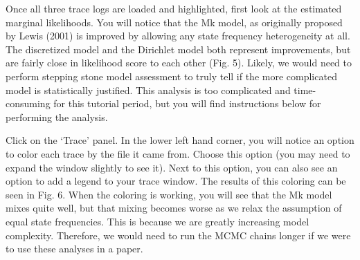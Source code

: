 Once all three trace logs are loaded and highlighted, first look at the estimated marginal likelihoods.
You will notice that the Mk model, as originally proposed by Lewis (2001) is improved by allowing any state frequency heterogeneity at all. 
The discretized model and the Dirichlet model both represent improvements, but are fairly close in likelihood score to each other (Fig. 5).
Likely, we would need to perform stepping stone model assessment to truly tell if the more complicated model is statistically justified.
This analysis is too complicated and time-consuming for this tutorial period, but you will find instructions below for performing the analysis. \par
\begin{figure}[h!]
\label{fig:module-gm}
\end{figure}

Click on the `Trace' panel.
In the lower left hand corner, you will notice an option to color each trace by the file it came from.
Choose this option (you may need to expand the window slightly to see it).
Next to this option, you can also see an option to add a legend to your trace window.
The results of this coloring can be seen in Fig. 6.
When the coloring is working, you will see that the Mk model mixes quite well, but that mixing becomes worse as we relax the assumption of equal state frequencies.
This is because we are greatly increasing model complexity.
Therefore, we would need to run the MCMC chains longer if we were to use these analyses in a paper. \par

\begin{figure}[h!]
\label{fig:module-gm}
\end{figure}
